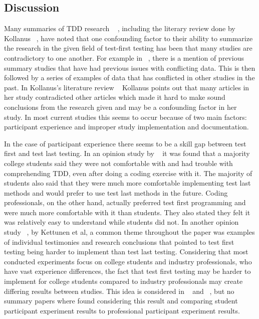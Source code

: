 \documentclass{sig-alternate}
\begin{document}
\subsection{Discussion}
Many summaries of TDD research ~\cite{Hammond:2012, Hellman:2012, Kettunen:2010} , including the literary review done by Kollanus ~\cite{Kollanus:2010}, have noted that one confounding factor to their ability to summarize the research in the given field of test-first testing has been that many studies are contradictory to one another.  For example in ~\cite{Hellman:2012},  there is a mention of previous summary studies that have had previous issues with conflicting data.  This is then followed by a series of examples of data that has conflicted in other studies in the past.  In Kollanus’s literature review ~\cite{Kollanus:2010} Kollanus points out that many articles in her study contradicted other articles which made it hard to make sound conclusions from the research given and may be a confounding factor in her study.  In most current studies this seems to occur because of two main factors: participant experience and improper study implementation and documentation.

In the case of participant experience there seems to be a skill gap between test first and test last testing.  In an opinion study by ~\cite{Janzen:2007} it was found that a majority college students said they were not comfortable with and had trouble with comprehending TDD, even after doing a coding exercise with it.  The majority of students also said that they were much more comfortable implementing test last methods and would prefer to use test last methods in the future.  Coding professionals, on the other hand, actually preferred test first programming and were much more comfortable with it than students.  They also stated they felt it was relatively easy to understand while students did not. In another opinion study ~\cite{Kettunen:2010}, by Kettunen et al, a common theme throughout the paper was examples of individual testimonies and research conclusions that pointed to test first testing being harder to implement than test last testing.   Considering that most conducted experiments focus on college students and industry professionals, who have vast experience differences, the fact that test first testing may be harder to implement for college students compared to industry professionals may create differing results between studies.   This idea is considered in ~\cite{Hammond:2012} and ~\cite{Kettunen:2010}, but no summary papers where found considering this result and comparing student participant experiment results to professional participant experiment results.
\end{document}
